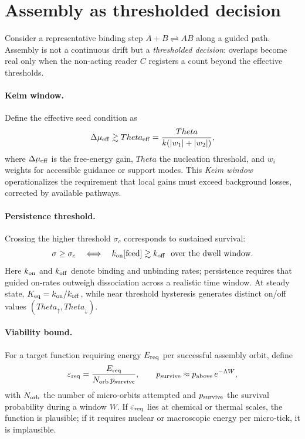 \documentclass[12pt,a4paper,oneside]{scrreprt}
\def\Theta{Theta}%
\begin{document}
\section{Assembly as thresholded decision}\label{sec:assembly-threshold}

Consider a representative binding step 
$A + B \rightleftharpoons AB$ along a guided path. 
Assembly is not a continuous drift but a \emph{thresholded decision}: 
overlaps become real only when the non-acting reader $C$ registers 
a count beyond the effective thresholds. 

\paragraph{Keim window.} 
Define the effective seed condition as
\[
\Delta\mu_{\rm eff} \gtrsim \Theta_{\rm eff}
= \frac{\Theta}{k(|w_1|+|w_2|)},
\]
where $\Delta\mu_{\rm eff}$ is the free-energy gain, 
$\Theta$ the nucleation threshold, and $w_i$ weights 
for accessible guidance or support modes. 
This \emph{Keim window} operationalizes the requirement that 
local gains must exceed background losses, corrected by 
available pathways. 

\paragraph{Persistence threshold.} 
Crossing the higher threshold $\sigma_c$ corresponds to 
sustained survival: 
\[
\sigma \ge \sigma_c \quad \Longleftrightarrow \quad 
k_{\rm on}[\text{feed}] \gtrsim k_{\rm off}
\ \ \text{over the dwell window}.
\]
Here $k_{\rm on}$ and $k_{\rm off}$ denote binding and 
unbinding rates; persistence requires that guided 
on-rates outweigh dissociation across a realistic 
time window. At steady state, 
$K_{\rm eq} = k_{\rm on}/k_{\rm off}$, 
while near threshold hysteresis generates 
distinct on/off values $(\Theta_\uparrow,\Theta_\downarrow)$. 

\paragraph{Viability bound.} 
For a target function requiring energy $E_{\rm req}$ 
per successful assembly orbit, define
\[
\varepsilon_{\rm req} = 
\frac{E_{\rm req}}{N_{\rm orb}\,p_{\rm survive}}, 
\qquad 
p_{\rm survive} \approx 
p_{\rm above}\,e^{-\Lambda W},
\]
with $N_{\rm orb}$ the number of micro-orbits attempted 
and $p_{\rm survive}$ the survival probability during 
a window $W$. 
If $\varepsilon_{\rm req}$ lies at chemical or thermal scales, 
the function is plausible; if it requires nuclear or macroscopic 
energy per micro-tick, it is implausible. 
\end{document}
